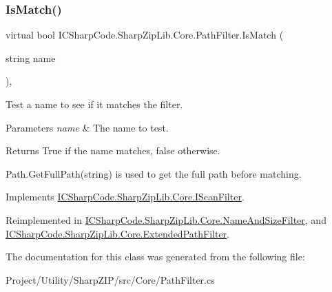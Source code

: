 \subsubsection{\texorpdfstring{Is\+Match()}{IsMatch()}}
{\footnotesize\ttfamily virtual bool I\+C\+Sharp\+Code.\+Sharp\+Zip\+Lib.\+Core.\+Path\+Filter.\+Is\+Match (\begin{DoxyParamCaption}\item[{string}]{name }\end{DoxyParamCaption})\hspace{0.3cm}{\ttfamily [inline]}, {\ttfamily [virtual]}}



Test a name to see if it matches the filter. 


\begin{DoxyParams}{Parameters}
{\em name} & The name to test.\\
\hline
\end{DoxyParams}
\begin{DoxyReturn}{Returns}
True if the name matches, false otherwise.
\end{DoxyReturn}


Path.\+Get\+Full\+Path(string) is used to get the full path before matching.

Implements \hyperlink{interface_i_c_sharp_code_1_1_sharp_zip_lib_1_1_core_1_1_i_scan_filter_aea9e60fe7abb0e8c969d884b96b84096}{I\+C\+Sharp\+Code.\+Sharp\+Zip\+Lib.\+Core.\+I\+Scan\+Filter}.



Reimplemented in \hyperlink{class_i_c_sharp_code_1_1_sharp_zip_lib_1_1_core_1_1_name_and_size_filter_a90dcfdf271d08f047b386b8c161b264d}{I\+C\+Sharp\+Code.\+Sharp\+Zip\+Lib.\+Core.\+Name\+And\+Size\+Filter}, and \hyperlink{class_i_c_sharp_code_1_1_sharp_zip_lib_1_1_core_1_1_extended_path_filter_a4d66921d72a1b16622a14083b2fb790d}{I\+C\+Sharp\+Code.\+Sharp\+Zip\+Lib.\+Core.\+Extended\+Path\+Filter}.



The documentation for this class was generated from the following file\+:\begin{DoxyCompactItemize}
\item 
Project/\+Utility/\+Sharp\+Z\+I\+P/src/\+Core/Path\+Filter.\+cs\end{DoxyCompactItemize}
